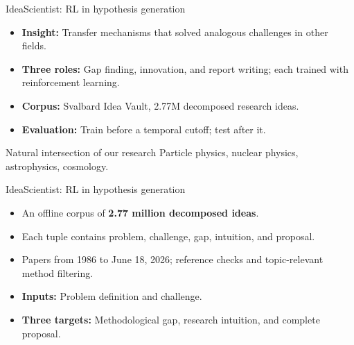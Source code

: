 \begin{frame}[c,label=md-15]{IdeaScientist: RL in hypothesis generation}
\small
\begin{itemize}
\setlength{\itemsep}{0.65em}
    \item \textbf{Insight:} Transfer mechanisms that solved analogous challenges in other fields.
    \item \textbf{Three roles:} Gap finding, innovation, and report writing;
    each trained with reinforcement learning.
    \item \textbf{Corpus:} Svalbard Idea Vault, 2.77M decomposed research ideas.
    \item \textbf{Evaluation:} Train before a temporal cutoff; test after it.
\end{itemize}
\medskip
\begin{block}{Natural intersection of our research}
Particle physics, nuclear physics, astrophysics, cosmology.
\end{block}
\end{frame}

\begin{frame}[t,label=md-16]{IdeaScientist: RL in hypothesis generation}
\small
{}
\smallskip
\begin{itemize}
\setlength{\itemsep}{0.65em}
    \item An offline corpus of \textbf{2.77 million decomposed ideas}.
    \item Each tuple contains problem, challenge, gap, intuition, and proposal.
    \item Papers from 1986 to June 18, 2026; reference checks and topic-relevant method filtering.
    \item \textbf{Inputs:} Problem definition and challenge.
    \item \textbf{Three targets:} Methodological gap, research intuition, and complete proposal.
\end{itemize}
\end{frame}

